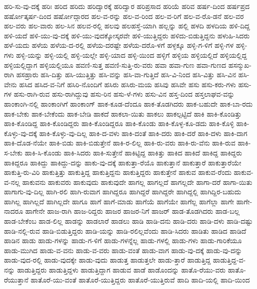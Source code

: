 {ಹರಿ-ಸು-ವು-ದಕ್ಕೆ
ಹರಿಃ
ಹರಿದ
ಹರಿದು
ಹರಿದ್ವಾರಕ್ಕೆ
ಹರಿದ್ವಾರ
ಹರಿಪ್ರಸಾದ
ಹರಿಯೆ
ಹರಿವ
ಹರ್ಷ-ದಿಂದ
ಹರ್ಷಪ್ರದ
ಹರ್ಷೋತ್ಕರ್ಷ-ದಿಂದ
ಹರ್ಷೋದ್ಗಾರದ
ಹಲ-ವ-ರನ್ನು
ಹಲ-ವ-ರಿಂದ
ಹಲ-ವ-ರಿಗೆ
ಹಲ-ವ-ರೊ-ಡನೆ
ಹಲ-ವರ
ಹಲ-ವರು
ಹಲ-ವಾರು
ಹಲ-ಸಿನ
ಹಲವ-ರಲ್ಲಿ
ಹಲವು
ಹಲಹಸ್ತೆ-ಯಾಗಿ
ಹಲ್ಲನ್ನು
ಹಲ್ಲಿ
ಹಳದಿ
ಹಳದಿಯ
ಹಳಿ-ದಿದ್ದ
ಹಳಿ-ಯದೆ
ಹಳಿ-ಯು-ವು-ದಕ್ಕೆ
ಹಳಿ-ಯು-ವುದಕ್ಕೋಸ್ಕರವೇ
ಹಳಿ-ಯುತ್ತಿದ್ದರು
ಹಳಿದು-ಬಿಡುತ್ತಿದ್ದನು
ಹಳುಹಿ-ಸಿದರು
ಹಳೆ-ಯದು
ಹಳೆಯ
ಹಳೆಯ-ದ-ರಲ್ಲಿ
ಹಳೆಯ-ದರಷ್ಟೇ
ಹಳೆಯ-ದರೊ-ಳಗೆ
ಹಳ್ಳಕ್ಕೂ
ಹಳ್ಳಿ-ಗ-ಳಿಗೆ
ಹಳ್ಳಿ-ಗಳ
ಹಳ್ಳಿ-ಗಳು
ಹಳ್ಳಿ-ಯನ್ನು
ಹಳ್ಳಿ-ಯಲ್ಲಿ
ಹಳ್ಳಿ-ಯಲ್ಲೇ
ಹಳ್ಳಿ-ಯಾದ
ಹಳ್ಳಿ-ಯಿಂದ
ಹಳ್ಳಿಗೆ
ಹಳ್ಳಿಯ
ಹಳ್ಳಿಯಲ್ಲಿದೆ
ಹಳ್ಳಿಯಲ್ಲಿದ್ದ
ಹಳ್ಳಿಯಲ್ಲಿದ್ದಾಗ
ಹಳ್ಳಿಯಲ್ಲಿಯೂ
ಹವಣಿ-ಸುತ್ತ
ಹವಣಿ-ಸುತ್ತಿ-ರು-ವರು
ಹವಾ
ಹವಾ-ಗುಣ
ಹವಾ-ಗುಣದ
ಹಸನ್ಮುಖ-ರಾಗಿ
ಹಸಹ್ರಾರು
ಹಸಿ-ದಿತ್ತು
ಹಸಿ-ಯುತ್ತಿತ್ತು
ಹಸಿ-ವನ್ನು
ಹಸಿ-ವಾ-ಗುತ್ತಿದೆ
ಹಸಿ-ವಿ-ನಿಂದ
ಹಸಿ-ವಿತ್ತು
ಹಸಿ-ವಿನ
ಹಸಿ-ವೇನು
ಹಸಿದ
ಹಸಿದ-ವ-ನಿಗೆ
ಹಸಿರಿ-ನೊಂದಿಗೆ
ಹಸಿರು
ಹಸಿರು-ಮಯ
ಹಸಿವು
ಹಸಿವೇ
ಹಸು
ಹಸು-ಕರು-ಗಳು
ಹಸು-ಗಳ
ಹಸು-ರಾಗಿ-ರುವ
ಹಸು-ರಾಗಿದ್ದುವು
ಹಸು-ರಿನ
ಹಸು-ಳೆ-ಗಳು
ಹಸು-ವಿನ
ಹಸ್ತ-ದಿಂದ
ಹಸ್ತಲಾಘವ-ವನ್ನು
ಹಾಂಕಾಂಗಿ-ನಲ್ಲಿ
ಹಾಂಕಾಂಗಿಗೆ
ಹಾಂಕಾಂಗ್
ಹಾಕ-ಕೂಡ-ದೆಂದೂ
ಹಾಕ-ತೊಡಗಿದರು
ಹಾಕ-ಬಹುದೇ
ಹಾಕ-ಬಾ-ರದು
ಹಾಕ-ಬೇಕು
ಹಾಕ-ಬೇಕೆಂದು
ಹಾಕ-ಬೇಡಿ
ಹಾಕದೆ
ಹಾಕಲಾ-ಯಿತು
ಹಾಕಲು
ಹಾಕಲ್ಪಟ್ಟಿದೆ
ಹಾಕಿ
ಹಾಕಿ-ಕೊಂಡಿತ್ತು
ಹಾಕಿ-ಕೊಂಡಿದ್ದ
ಹಾಕಿ-ಕೊಂಡಿದ್ದರು
ಹಾಕಿ-ಕೊಂಡಿದ್ದರೂ
ಹಾಕಿ-ಕೊಂಡು
ಹಾಕಿ-ಕೊಳ್ಳ-ಕೂ-ಡದು
ಹಾಕಿ-ಕೊಳ್ಳಿ
ಹಾಕಿ-ಕೊಳ್ಳು-ವು-ದಕ್ಕೆ
ಹಾಕಿ-ಕೊಳ್ಳು-ವು-ದಿಲ್ಲ
ಹಾಕಿ-ದ-ವಳು
ಹಾಕಿ-ದಂತೆ
ಹಾಕಿ-ದರು
ಹಾಕಿ-ದರೆ
ಹಾಕಿ-ದಳು
ಹಾಕಿ-ದಾಗ
ಹಾಕಿ-ದೊಡ-ನೆಯೇ
ಹಾಕಿ-ಬಿಡು
ಹಾಕಿ-ಬಿಡುತ್ತೇನೆ
ಹಾಕಿ-ರ-ಲಿಲ್ಲ
ಹಾಕಿ-ರು-ವರು
ಹಾಕಿ-ರು-ವೆನು
ಹಾಕಿ-ರುವ
ಹಾಕಿ-ಸ-ಬೇಕು
ಹಾಕಿ-ಸಿ-ಕೊಂಡು
ಹಾಕಿ-ಸಿದರು
ಹಾಕಿ-ಸುತ್ತೇನೆ
ಹಾಕಿಟ್ಟಿದ್ದ
ಹಾಕಿತ್ತು
ಹಾಕಿದ
ಹಾಕಿದೆ
ಹಾಕಿದ್ದ
ಹಾಕಿದ್ದರು
ಹಾಕಿದ್ದರೂ
ಹಾಕಿದ್ದು
ಹಾಕಿದ್ದು-ದನ್ನು
ಹಾಕು-ವು-ದಕ್ಕೆ
ಹಾಕುತ್ತಾ-ರೆಯೊ
ಹಾಕುತ್ತಾನೆ
ಹಾಕುತ್ತಾರೆ
ಹಾಕುತ್ತಾರೆಯೇ
ಹಾಕುತ್ತಿ-ರು-ವಿರಿ
ಹಾಕುತ್ತಿತ್ತು
ಹಾಕುತ್ತಿದ್ದ
ಹಾಕುತ್ತಿದ್ದನು
ಹಾಕುತ್ತಿದ್ದರು
ಹಾಕುತ್ತೇನೆ
ಹಾಕುವ
ಹಾಕುವ-ರೆಂದು
ಹಾಕುವ-ವ-ನಲ್ಲ
ಹಾಕುವನು
ಹಾಕುವರು
ಹಾಕುವುದು
ಹಾಕುವುದೇ
ಹಾಗಲ್ಲ
ಹಾಗಲ್ಲದೆ
ಹಾಗಲ್ಲದೇ
ಹಾಗಾ-ದರೆ
ಹಾಗಾ-ಯಿತು
ಹಾಗಾಗು-ವು-ದಿಲ್ಲ
ಹಾಗಿ-ರಲಿ
ಹಾಗಿ-ರುವಾಗ
ಹಾಗಿದ್ದರೂ
ಹಾಗಿದ್ದರೆ
ಹಾಗಿದ್ದರೇ
ಹಾಗಿದ್ದಲ್ಲಿ
ಹಾಗಿದ್ದಿರ-ಬಹುದು
ಹಾಗಿಲ್ಲ
ಹಾಗಿಲ್ಲದೆ
ಹಾಗಿಲ್ಲದೇ
ಹಾಗೂ
ಹಾಗೆ
ಹಾಗೆ-ಮಾಡು
ಹಾಗೆಯೆ
ಹಾಗೆಯೇ
ಹಾಗೆಲ್ಲ
ಹಾಗೆಲ್ಲಾ
ಹಾಗೇ
ಹಾಗೇ-ನಾದರೂ
ಹಾಗೇನೇ
ಹಾಜ-ರಾಗಿ
ಹಾಜ-ರಿದ್ದರು
ಹಾಜರ
ಹಾಜರ-ನಿಗೆ
ಹಾಜರ್
ಹಾಡ-ತೊಡಗಿದರು
ಹಾಡ-ಬಲ್ಲ
ಹಾಡ-ಬೇಕೆಂಬ
ಹಾಡ-ಲಿಲ್ಲ
ಹಾಡನ್ನು
ಹಾಡಲಾರೆ
ಹಾಡಲು
ಹಾಡಿ
ಹಾಡಿ-ದನು
ಹಾಡಿ-ದರು
ಹಾಡಿ-ದಳು
ಹಾಡಿ-ದಷ್ಟು
ಹಾಡಿ-ನಲ್ಲಿ-ರುವ
ಹಾಡಿ-ಬಿಡುತ್ತಿದ್ದರು
ಹಾಡಿ-ಯನ್ನು
ಹಾಡಿ-ರಲಿಲ್ಲವೆಂದು
ಹಾಡಿ-ಸಿದರು
ಹಾಡಿತು
ಹಾಡಿದ
ಹಾಡಿದೆ
ಹಾಡಿನ
ಹಾಡು
ಹಾಡು-ಗಳನ್ನು
ಹಾಡು-ಗ-ಳಿಗೆ
ಹಾಡು-ಗಳನ್ನೆಲ್ಲ
ಹಾಡು-ಗಳಲ್ಲಿ
ಹಾಡು-ಗಳು
ಹಾಡು-ಗಾರಿಕೆಯೂ
ಹಾಡು-ಮುಗಿದ
ಹಾಡು-ವ-ವನು
ಹಾಡು-ವ-ವರು
ಹಾಡು-ವಂತೆ
ಹಾಡು-ವಾಗ
ಹಾಡು-ವು-ದಕ್ಕೆ
ಹಾಡು-ವು-ದನ್ನು
ಹಾಡು-ವುದ-ರಲ್ಲಿ
ಹಾಡು-ವುದಕ್ಕೇ
ಹಾಡು-ವುದು
ಹಾಡುತ್ತ
ಹಾಡುತ್ತಲೇ
ಹಾಡು-ತ್ತಾರೆ
ಹಾಡುತ್ತಿದ್ದ
ಹಾಡುತ್ತಿದ್ದ-ವ-ನನ್ನು
ಹಾಡುತ್ತಿದ್ದರು
ಹಾಡುತ್ತಿದ್ದಳು
ಹಾಡುತ್ತಿದ್ದಾಗ
ಹಾಡುವ
ಹಾಡೆ
ಹಾಡೊಂದನ್ನು
ಹಾತೊ-ರೆಯು-ವರು
ಹಾತೊ-ರೆಯುತ್ತಾನೆ
ಹಾತೊರೆ-ಯು-ವಂತೆ
ಹಾತೊರೆ-ಯುತ್ತಿದ್ದರು
ಹಾತೊರೆ-ಯುತ್ತಿರುವೆ
ಹಾದಿ
ಹಾದಿ-ಯಲ್ಲಿ
ಹಾದಿ-ಯಿಂದ
}
